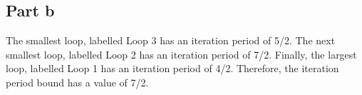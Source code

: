\subsection{Part b}

The smallest loop, labelled Loop 3 has an iteration period of 5/2. The next
smallest loop, labelled Loop 2 has an iteration period of 7/2. Finally, the
largest loop, labelled Loop 1 has an iteration period of 4/2. Therefore, the
iteration period bound has a value of 7/2.

